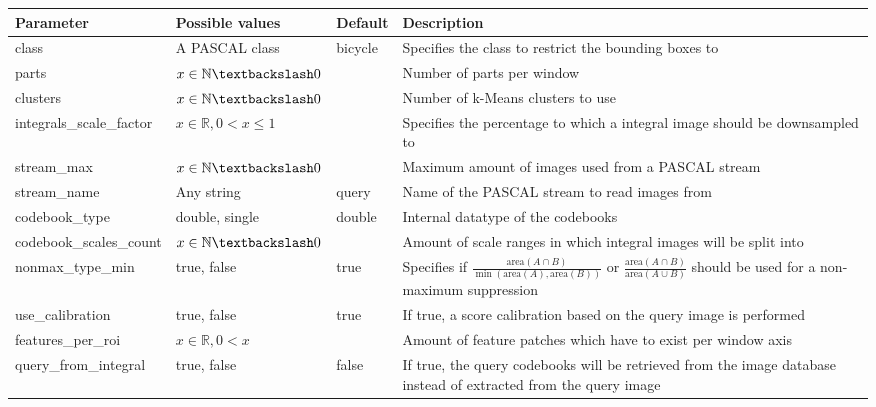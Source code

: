 \begin{longtable}{%
|%
p{}%
|%
>{\raggedright\arraybackslash}%
p{}%
|%
>{\raggedright\arraybackslash}%
p{}%
|%
>{\raggedright\arraybackslash}%
p{}%
|%
}
\hline \textbf{Parameter} & \textbf{Possible values} & \textbf{Default} & \textbf{Description} \\ 
\hline
\hline class & A PASCAL class & bicycle & Specifies the class to restrict the bounding boxes to \\ 
\hline parts & $x \in \mathbb{N} \textbackslash 0$ & 4 & Number of parts per window \\ 
\hline clusters & $x \in \mathbb{N} \textbackslash 0$ & 1000 & Number of k-Means clusters to use \\ 
\hline integrals\allowbreak\_scale\allowbreak\_factor & $x \in \mathbb{R}, 0 < x \le 1$ & 1 & Specifies the percentage to which a integral image should be downsampled to \\ 
\hline stream\allowbreak\_max & $x \in \mathbb{N} \textbackslash 0$ & 100 & Maximum amount of images used from a PASCAL stream \\ 
\hline stream\allowbreak\_name & Any string & query & Name of the PASCAL stream to read images from \\ 
\hline codebook\allowbreak\_type & double, single & double & Internal datatype of the codebooks \\ 
\hline codebook\allowbreak\_scales\allowbreak\_count & $x \in \mathbb{N} \textbackslash 0$ & 3 & Amount of scale ranges in which integral images will be split into \\ 
\hline nonmax\allowbreak\_type\allowbreak\_min & true, false & true & Specifies if $\frac{\text{area}(A \cap B)}{\min(\text{area}(A), \text{area}(B))}$ or $\frac{\text{area}(A \cap B)}{\text{area}(A \cup B)}$ should be used for a non-maximum suppression \\ 
\hline use\allowbreak\_calibration & true, false & true & If true, a score calibration based on the query image is performed \\ 
\hline features\allowbreak\_per\allowbreak\_roi & $x \in \mathbb{R}, 0 < x$ & 2 & Amount of feature patches which have to exist per window axis \\ 
\hline query\allowbreak\_from\allowbreak\_integral & true, false & false & If true, the query codebooks will be retrieved from the image database instead of extracted from the query image \\ 

\end{longtable}
